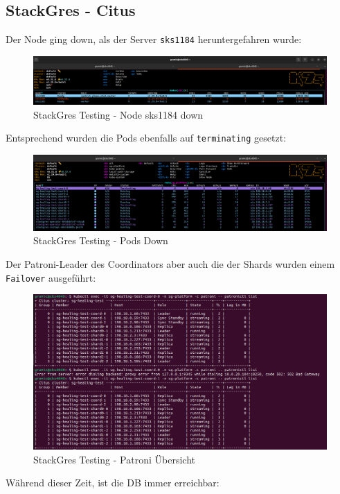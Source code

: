 
\begin{flushleft}
    \subsection{StackGres - Citus}
    Der Node ging down, als der Server \texttt{sks1184} heruntergefahren wurde:
    \begin{figure}[H]
        \centering
        \includegraphics[width=0.5\linewidth]{source/appendix/evaluation_testing/stackgres_node_sks1184_down}
        \caption{StackGres Testing - Node sks1184 down}
        \label{fig:stackgres_node_sks1184_down}
    \end{figure}
    Entsprechend wurden die Pods ebenfalls auf \texttt{terminating} gesetzt:
    \begin{figure}[H]
        \centering
        \includegraphics[width=0.5\linewidth]{source/appendix/evaluation_testing/stackgres_citus_testing_node_down}
        \caption{StackGres Testing - Pods Down}
        \label{fig:stackgres_citus_testing_node_down}
    \end{figure}
    Der Patroni-Leader des Coordinators aber auch die der Shards wurden einem \texttt{Failover} ausgeführt:
    \begin{figure}[H]
        \centering
        \includegraphics[width=0.5\linewidth]{source/appendix/evaluation_testing/stackgres_patroni_failover_overview}
        \caption{StackGres Testing - Patroni Übersicht}
        \label{fig:stackgres_patroni_failover_overview}
    \end{figure}
    Während dieser Zeit, ist die DB immer erreichbar:
    \begin{figure}[H]
        \centering

\end{figure}
\end{flushleft}
